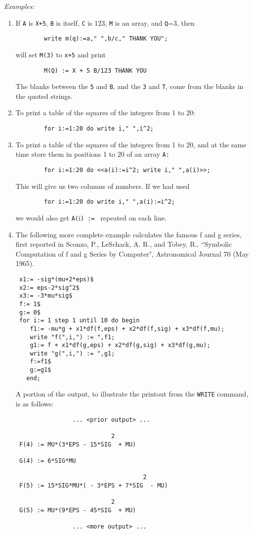 {\it Examples:}
\begin{enumerate}
\item If {\tt A} is {\tt X+5}, {\tt B} is itself, {\tt C} is 123, {\tt M} is
an array, and {\tt Q}=3, then
\begin{verbatim}
        write m(q):=a," ",b/c," THANK YOU";
\end{verbatim}
will set {\tt M(3)} to {\tt x+5} and print
\begin{verbatim}
        M(Q) := X + 5 B/123 THANK YOU
\end{verbatim}
The blanks between the {\tt 5} and {\tt B}, and the
{\tt 3} and {\tt T}, come from the blanks in the quoted strings.

\item To print a table of the squares of the integers from 1 to 20:
\begin{verbatim}
        for i:=1:20 do write i," ",i^2;
\end{verbatim}

\item To print a table of the squares of the integers from 1 to 20, and at
the same time store them in positions 1 to 20 of an array {\tt A:}
\begin{verbatim}
        for i:=1:20 do <<a(i):=i^2; write i," ",a(i)>>;
\end{verbatim}
This will give us two columns of numbers. If we had used
\begin{verbatim}
        for i:=1:20 do write i," ",a(i):=i^2;
\end{verbatim}
we would also get {\tt A(}i{\tt ) := } repeated on each line.

\item The following more complete example calculates the famous f and g
series, first reported in Sconzo, P., LeSchack, A. R., and Tobey, R.,
``Symbolic Computation of f and g Series by Computer", Astronomical Journal
70 (May 1965).
\begin{verbatim}
 x1:= -sig*(mu+2*eps)$
 x2:= eps-2*sig^2$
 x3:= -3*mu*sig$
 f:= 1$
 g:= 0$
 for i:= 1 step 1 until 10 do begin
    f1:= -mu*g + x1*df(f,eps) + x2*df(f,sig) + x3*df(f,mu);
    write "f(",i,") := ",f1;
    g1:= f + x1*df(g,eps) + x2*df(g,sig) + x3*df(g,mu);
    write "g(",i,") := ",g1;
    f:=f1$
    g:=g1$
   end;
\end{verbatim}
 A portion of the output, to illustrate the printout from the {\tt WRITE}
command, is as follows:
\begin{verbatim}
                ... <prior output> ...

                           2
 F(4) := MU*(3*EPS - 15*SIG  + MU)

 G(4) := 6*SIG*MU

                                    2
 F(5) := 15*SIG*MU*( - 3*EPS + 7*SIG  - MU)

                           2
 G(5) := MU*(9*EPS - 45*SIG  + MU)

                ... <more output> ...

\end{verbatim}
\end{enumerate}
